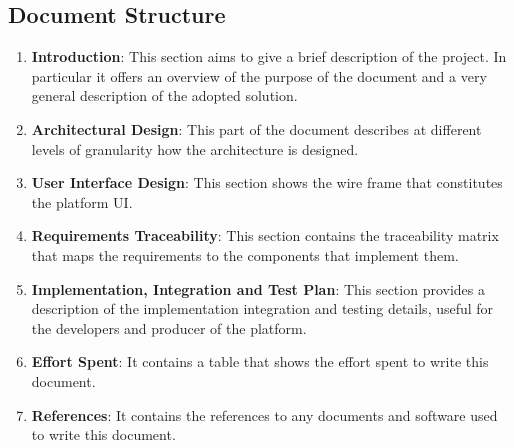 \subsection{Document Structure}
\begin{enumerate}
    \item \textbf{Introduction}: This section aims to give a brief description of the project. In particular it offers an overview of the purpose of the document and a very general description of the adopted solution.
    \item \textbf{Architectural Design}: This part of the document describes at different levels of granularity how the architecture is designed.
    \item \textbf{User Interface Design}: This section shows the wire frame that constitutes the platform UI.
    \item \textbf{Requirements Traceability}: This section contains the traceability matrix that maps the requirements to the components that implement them.
    \item \textbf{Implementation, Integration and Test Plan}: This section provides a description of the implementation integration and testing details, useful for the developers and producer of the platform.
    \item \textbf{Effort Spent}: It contains a table that shows the effort spent to write this document.
    \item \textbf{References}: It contains the references to any documents and software used to write this document.
\end{enumerate}